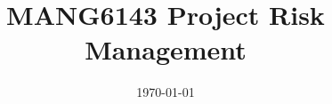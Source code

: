 \documentclass{ecsarticle}     %
\begin{document}
\frontmatter
\title      {MANG6143 Project Risk Management}
\purpose  {}
\addresses  {\purname\\\coname\\\univname}
\date       {\today}
\subject    {Performance Uncertainty Management Processes - Overview and Appraisal}
\keywords   {}
\maketitle
\begin{abstract}
\lipsum[1]
\end{abstract}



\mainmatter




\backmatter




\appendix
\end{document}
